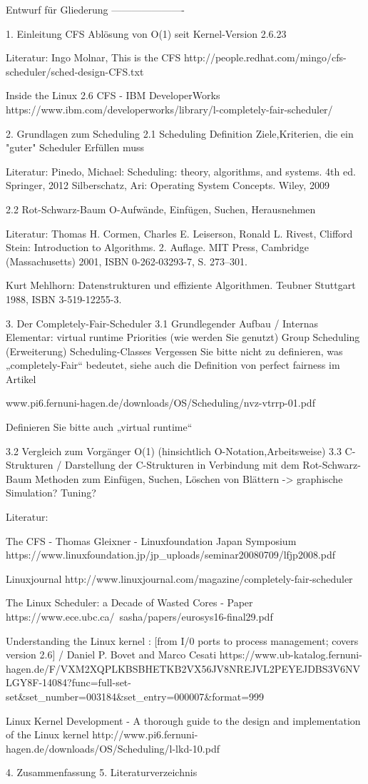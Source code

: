 Entwurf für Gliederung
----------------------

1. Einleitung
	CFS Ablösung von O(1) seit Kernel-Version 2.6.23

	Literatur:
	Ingo Molnar, This is the CFS
		http://people.redhat.com/mingo/cfs-scheduler/sched-design-CFS.txt

	Inside the Linux 2.6 CFS - IBM DeveloperWorks
		https://www.ibm.com/developerworks/library/l-completely-fair-scheduler/

2. Grundlagen zum Scheduling
2.1  Scheduling
	Definition
	Ziele,Kriterien, die ein "guter" Scheduler Erfüllen muss

	Literatur:
	Pinedo, Michael: Scheduling: theory, algorithms, and systems. 4th ed.
	Springer, 2012
	Silberschatz, Ari: Operating System Concepts. Wiley, 2009

2.2 Rot-Schwarz-Baum
	O-Aufwände, Einfügen, Suchen, Herausnehmen

	Literatur:
	Thomas H. Cormen, Charles E. Leiserson, Ronald L. Rivest, Clifford Stein: Introduction to Algorithms. 2. Auflage. MIT Press, Cambridge (Massachusetts) 2001, ISBN 0-262-03293-7, S. 273–301.

	Kurt Mehlhorn: Datenstrukturen und effiziente Algorithmen. Teubner Stuttgart 1988, ISBN 3-519-12255-3.

3. Der Completely-Fair-Scheduler
  	3.1 Grundlegender Aufbau / Internas
		Elementar: virtual runtime
		Priorities (wie werden Sie genutzt)
		Group Scheduling (Erweiterung)
		Scheduling-Classes
		Vergessen Sie bitte nicht zu definieren, was „completely-Fair“ bedeutet, siehe auch die Definition von perfect fairness im Artikel
		
		www.pi6.fernuni-hagen.de/downloads/OS/Scheduling/nvz-vtrrp-01.pdf
		
		Definieren Sie bitte auch „virtual runtime“
	
	3.2 Vergleich zum Vorgänger O(1) (hinsichtlich O-Notation,Arbeitsweise)
	3.3 C-Strukturen / Darstellung der C-Strukturen in Verbindung mit dem Rot-Schwarz-Baum
		Methoden zum Einfügen, Suchen, Löschen von Blättern -> graphische Simulation?
		Tuning?

	Literatur:

	The CFS - Thomas Gleixner - Linuxfoundation Japan Symposium
		https://www.linuxfoundation.jp/jp_uploads/seminar20080709/lfjp2008.pdf

	Linuxjournal
		http://www.linuxjournal.com/magazine/completely-fair-scheduler

	The Linux Scheduler: a Decade of Wasted Cores - Paper
		https://www.ece.ubc.ca/~sasha/papers/eurosys16-final29.pdf

	Understanding the Linux kernel : [from I/0 ports to process management; covers version 2.6] / Daniel P. Bovet and Marco Cesati
		https://www.ub-katalog.fernuni-hagen.de/F/VXM2XQPLKBSBHETKB2VX56JV8NREJVL2PEYEJDBS3V6NVLGY8F-14084?func=full-set-set&set_number=003184&set_entry=000007&format=999

	Linux Kernel Development - A thorough guide to the design and implementation of the Linux kernel
		http://www.pi6.fernuni-hagen.de/downloads/OS/Scheduling/l-lkd-10.pdf

4. Zusammenfassung
5. Literaturverzeichnis
